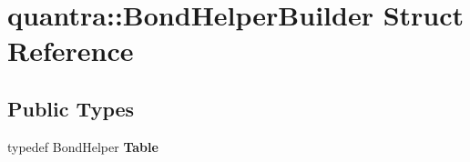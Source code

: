 \hypertarget{structquantra_1_1BondHelperBuilder}{}\section{quantra\+:\+:Bond\+Helper\+Builder Struct Reference}
\label{structquantra_1_1BondHelperBuilder}
\subsection*{Public Types}
\begin{DoxyCompactItemize}
\item 
\mbox{\label{structquantra_1_1BondHelperBuilder_af5412fac8f0b82d8f624649a6fa569f4}} 
typedef Bond\+Helper {\bfseries Table}
\end{DoxyCompactItemize}
